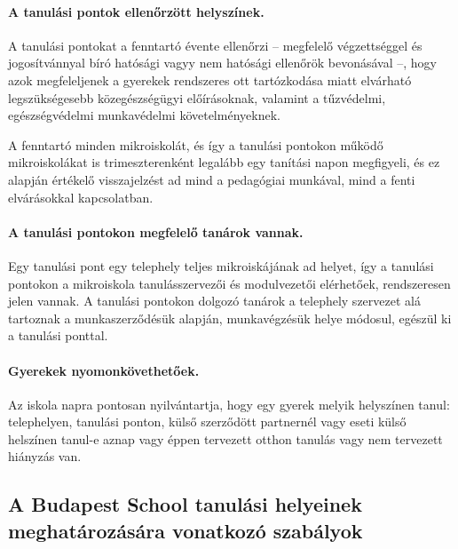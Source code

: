 \paragraph{A tanulási pontok ellenőrzött helyszínek.}

A tanulási pontokat a fenntartó évente ellenőrzi -- megfelelő végzettséggel és jogosítvánnyal bíró hatósági vagyy nem hatósági ellenőrök bevonásával --, hogy azok megfeleljenek a gyerekek rendszeres ott tartózkodása miatt elvárható legszükségesebb közegészségügyi előírásoknak, valamint a tűzvédelmi, egészségvédelmi  munkavédelmi követelményeknek.

A fenntartó minden mikroiskolát, és így a tanulási pontokon működő mikroiskolákat is trimeszterenként legalább egy tanítási napon megfigyeli, és ez alapján értékelő visszajelzést ad mind a pedagógiai munkával, mind a fenti elvárásokkal kapcsolatban.

\paragraph{A tanulási pontokon megfelelő tanárok vannak.}

Egy tanulási pont egy telephely teljes mikroiskájának ad helyet, így a tanulási pontokon a mikroiskola tanulásszervezői és modulvezetői elérhetőek, rendszeresen jelen vannak. A tanulási pontokon dolgozó tanárok a telephely szervezet alá tartoznak a munkaszerződésük alapján, munkavégzésük helye módosul, egészül ki a tanulási ponttal.

\paragraph{Gyerekek nyomonkövethetőek.}

Az iskola napra pontosan nyilvántartja, hogy egy gyerek melyik helyszínen tanul: telephelyen, tanulási ponton, külső szerződött partnernél vagy eseti külső helszínen tanul-e aznap vagy éppen tervezett otthon tanulás vagy nem tervezett hiányzás van.

\subsection{A Budapest School tanulási helyeinek meghatározására vonatkozó szabályok}

